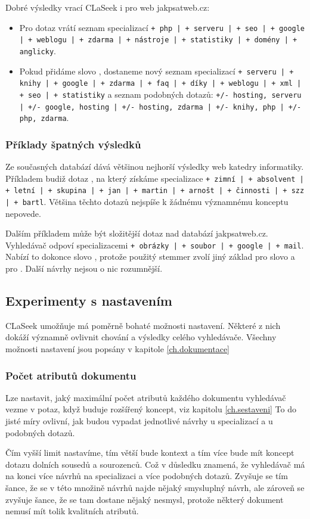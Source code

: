 \documentclass[12pt]{article}
\newcommand{\name}{CLaSeek}
\newcommand{\code}[1]{\texttt{#1}}
\newcommand{\ssection}[1]{\subsection{#1}}
\newcommand{\sssection}[1]{\subsubsection{#1}}
\begin{document}
Dobré výsledky vrací \name{} i pro web jakpsatweb.cz: 

\begin{itemize}
	\item Pro dotaz  vrátí seznam specializací \code{+ php | + serveru | + seo | + google | + weblogu | + zdarma | + nástroje | + statistiky | + domény | + anglicky}. 
	\item Pokud přidáme slovo , dostaneme nový seznam specializací \code{+ serveru | + knihy | + google | + zdarma | + faq | + díky | + weblogu | + xml | + seo | + statistiky} a seznam podobných dotazů: \code{+/- hosting, serveru | +/- google, hosting | +/- hosting, zdarma | +/- knihy, php | +/- php, zdarma}.
\end{itemize}

\sssection{Příklady špatných výsledků}

Ze současných databází dává většinou nejhorší výsledky web katedry informatiky. Příkladem budiž dotaz , na který získáme specializace \code{+ zimní | + absolvent | + letní | + skupina | + jan | + martin | + arnošt | + činnosti | + szz | + bartl}. Většina těchto dotazů nejspíše k žádnému významnému konceptu nepovede. 

Dalším příkladem může být složitější dotaz  nad databází jakpsatweb.cz. Vyhledávač odpoví specializacemi \code{+ obrázky | + soubor | + google | + mail}. Nabízí to dokonce slovo , protože použitý stemmer zvolí jiný základ pro slovo  a pro . Další návrhy nejsou o nic rozumnější. 


\ssection{Experimenty s nastavením}
\name{} umožňuje má poměrně bohaté možnosti nastavení. Některé z nich dokáží významně ovlivnit chování a výsledky celého vyhledávače. Všechny možnosti nastavení jsou popsány v kapitole \ref{ch.dokumentace}

\sssection{Počet atributů dokumentu}
Lze nastavit, jaký maximální počet atributů každého dokumentu vyhledávač vezme v potaz, když buduje rozšířený koncept, viz kapitolu \ref{ch.sestaveni} To do jisté míry ovlivní, jak budou vypadat jednotlivé návrhy u specializací a u podobných dotazů. 

Čím vyšší limit nastavíme, tím větší bude kontext a tím více bude mít koncept dotazu dolních sousedů a sourozenců. Což v důsledku znamená, že vyhledávač má na konci více návrhů na specializaci a více podobných dotazů. Zvyšuje se tím šance, že se v této množině návrhů najde nějaký smysluplný návrh, ale zároveň se zvyšuje šance, že se tam dostane nějaký nesmysl, protože některý dokument nemusí mít tolik kvalitních atributů. 
\end{document}
